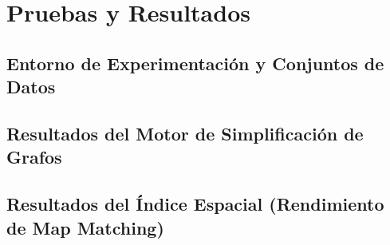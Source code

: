 \chapter{Pruebas y Resultados}

\section{Entorno de Experimentación y Conjuntos de Datos}

\section{Resultados del Motor de Simplificación de Grafos}

\section{Resultados del Índice Espacial (Rendimiento de Map Matching)}
